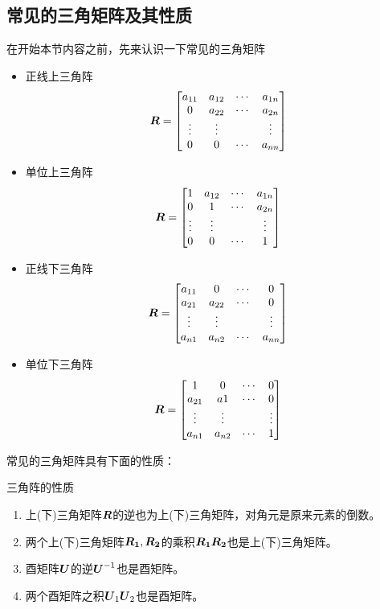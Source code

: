 \documentclass[12pt, a4paper, oneside, UTF8]{ctexbook}
\begin{document}
\subsection{常见的三角矩阵及其性质}
在开始本节内容之前，先来认识一下常见的三角矩阵
    \begin{itemize}
        \item 正线上三角阵\[\boldsymbol{R}=\begin{bmatrix}
            a_{11}&a_{12}&\cdots&a_{1n}\\
            0&a_{22}&\cdots&a_{2n}\\
            \vdots&\vdots&&\vdots\\
            0&0&\cdots&a_{nn}
        \end{bmatrix}\]
        \item 单位上三角阵\[\boldsymbol{R}=\begin{bmatrix}
            1&a_{12}&\cdots&a_{1n}\\
            0&1&\cdots&a_{2n}\\
            \vdots&\vdots&&\vdots\\
            0&0&\cdots&1
        \end{bmatrix}\]
        \item 正线下三角阵\[\boldsymbol{R}=\begin{bmatrix}
            a_{11}&0&\cdots&0\\
            a_{21}&a_{22}&\cdots&0\\
            \vdots&\vdots&&\vdots\\
            a_{n1}&a_{n2}&\cdots&a_{nn}
        \end{bmatrix}\]
        \item 单位下三角阵\[\boldsymbol{R}=\begin{bmatrix}
            1&0&\cdots&0\\
            a_{21}&a1&\cdots&0\\
            \vdots&\vdots&&\vdots\\
            a_{n1}&a_{n2}&\cdots&1
        \end{bmatrix}\]
    \end{itemize}

    常见的三角矩阵具有下面的性质：
    \begin{them}{三角阵的性质}{}
        \begin{enumerate}
            \item 上(下)三角矩阵$\boldsymbol{R}$的逆也为上(下)三角矩阵，对角元是原来元素的倒数。
            \item 两个上(下)三角矩阵$\boldsymbol{R_1}, \boldsymbol{R_2}$的乘积$\boldsymbol{R_1R_2}$也是上(下)三角矩阵。
            \item 酉矩阵$\boldsymbol{U}$的逆$\boldsymbol{U}^{-1}$也是酉矩阵。
            \item 两个酉矩阵之积$\boldsymbol{U}_1\boldsymbol{U}_2$也是酉矩阵。
        \end{enumerate}
    \end{them}
\end{document}

